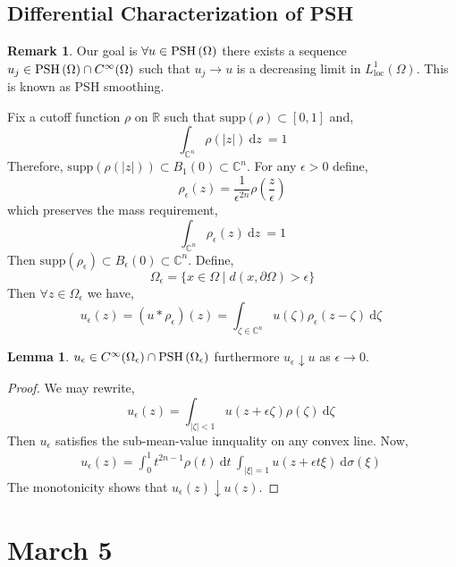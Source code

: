 \documentclass[12pt]{extarticle}
\newcommand{\R}{\mathbb{R}}
\newcommand{\C}{\mathbb{C}}
\renewcommand{\d}[1]{\: \mathrm{d}#1 \:}
\theoremstyle{definition}
\newtheorem{lemma}[theorem]{Lemma}
\newtheorem{remark}{Remark}
\newenvironment{definition}[1][Definition:]{\begin{trivlist}
\item[\hskip \labelsep {\bfseries #1}]}{\end{trivlist}}
\begin{document}
\subsection{Differential Characterization of PSH}

\newcommand{\supp}[1]{\mathrm{supp}\left( #1 \right)}

\begin{remark}
Our goal is $\forall u \in \mathrm{PSH}\left( \Omega \right)$ there exists a sequence $u_j \in \mathrm{PSH}\left( \Omega \right) \cap C^\infty(\Omega)$ such that $u_j \to u$ is a decreasing limit in $L^1_{\text{loc}}(\Omega)$. This is known as PSH smoothing. 
\end{remark}

\begin{definition}
Fix a cutoff function $\rho$ on $\R$ such that $\supp{\rho} \subset [0, 1]$ and,
\[ \int_{\C^n} \rho(|z|) \d{z} = 1 \]
Therefore, $\supp{\rho(|z|)} \subset B_1(0) \subset \C^n$. For any $\epsilon > 0$ define,
\[ \rho_{\epsilon}(z) = \frac{1}{\epsilon^{2 n}} \rho \left( \frac{z}{\epsilon} \right) \]
which preserves the mass requirement,
\[ \int_{\C^n} \rho_{\epsilon}(z) \d{z} = 1 \]
Then $\supp{\rho_{\epsilon}} \subset B_\epsilon(0) \subset \C^n$. Define,
\[ \Omega_{\epsilon} = \{ x \in \Omega \mid d(x, \partial \Omega) > \epsilon \} \]
Then $\forall z \in \Omega_\epsilon$ we have,
\[ u_\epsilon(z) = (u * \rho_\epsilon)(z) = \int_{\zeta \in \C^n} u(\zeta) \rho_\epsilon(z - \zeta) \d{\zeta} \]
\end{definition}

\begin{lemma}
$u_\epsilon \in C^{\infty}(\Omega_\epsilon) \cap \mathrm{PSH}\left( \Omega_\epsilon \right)$ furthermore $u_\epsilon \downarrow u$ as $\epsilon \to 0$.  
\end{lemma}

\begin{proof}
We may rewrite,
\[ u_\epsilon(z) = \int_{|\zeta| < 1} u(z + \epsilon \zeta) \rho(\zeta) \d{\zeta} \]
Then $u_{\epsilon}$ satisfies the sub-mean-value innquality on any convex line. Now,
\begin{align*}
u_\epsilon(z) = \int_0^1 t^{2n - 1} \rho(t) \d{t} \int_{|\xi| = 1} u(z + \epsilon t \xi) \d{\sigma(\xi)} 
\end{align*}
The monotonicity shows that $u_\epsilon(z) \downarrow u(z)$. 
\end{proof}

\section{March 5}
\end{document}
